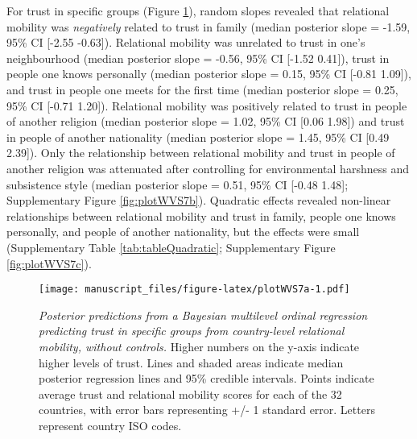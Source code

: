 \documentclass[
  man,floatsintext]{apa6}
\begin{document}
For trust in specific groups (Figure \ref{fig:plotWVS7a}), random slopes revealed that relational mobility was \emph{negatively} related to trust in family (median posterior slope = -1.59, 95\% CI {[}-2.55 -0.63{]}). Relational mobility was unrelated to trust in one's neighbourhood (median posterior slope = -0.56, 95\% CI {[}-1.52 0.41{]}), trust in people one knows personally (median posterior slope = 0.15, 95\% CI {[}-0.81 1.09{]}), and trust in people one meets for the first time (median posterior slope = 0.25, 95\% CI {[}-0.71 1.20{]}). Relational mobility was positively related to trust in people of another religion (median posterior slope = 1.02, 95\% CI {[}0.06 1.98{]}) and trust in people of another nationality (median posterior slope = 1.45, 95\% CI {[}0.49 2.39{]}). Only the relationship between relational mobility and trust in people of another religion was attenuated after controlling for environmental harshness and subsistence style (median posterior slope = 0.51, 95\% CI {[}-0.48 1.48{]}; Supplementary Figure \ref{fig:plotWVS7b}). Quadratic effects revealed non-linear relationships between relational mobility and trust in family, people one knows personally, and people of another nationality, but the effects were small (Supplementary Table \ref{tab:tableQuadratic}; Supplementary Figure \ref{fig:plotWVS7c}).



\begin{figure}
\centering
\texttt{[image: manuscript\_files/figure-latex/plotWVS7a-1.pdf]}
\caption{\label{fig:plotWVS7a}\emph{Posterior predictions from a Bayesian multilevel ordinal regression predicting trust in specific groups from country-level relational mobility, without controls.} Higher numbers on the y-axis indicate higher levels of trust. Lines and shaded areas indicate median posterior regression lines and 95\% credible intervals. Points indicate average trust and relational mobility scores for each of the 32 countries, with error bars representing +/- 1 standard error. Letters represent country ISO codes.}
\end{figure}
\end{document}
